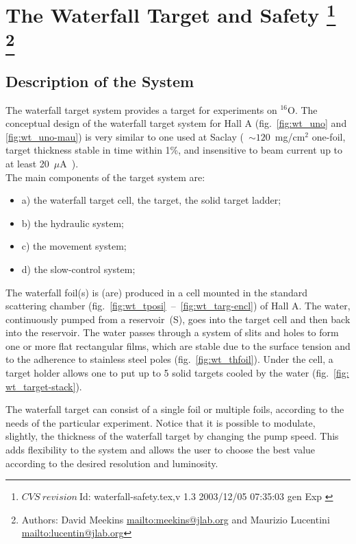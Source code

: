 \chapter[The Waterfall Target and Safety]{The Waterfall Target and Safety
\footnote{
  $CVS~revision~ $Id: waterfall-safety.tex,v 1.3 2003/12/05 07:35:03 gen Exp $ $
}
\footnote{Authors: David Meekins \url{mailto:meekins@jlab.org} and 
 Maurizio Lucentini \url{mailto:lucentin@jlab.org}}
}

\section{Description of the System}

The waterfall target system provides a target for experiments on $^{16}$O.
The conceptual design of the waterfall target system for Hall A (fig.~\ref{fig:wt_uno}
and \ref{fig:wt_uno-mau}) is very similar to one used at Saclay (~$\sim 120$~mg/cm$^{2}$
one-foil, target thickness stable in time within 1\%, and insensitive
to beam current up to at least 20~$\mu $A~\cite{Garibaldi:1992mb}).\\


The main components of the target system are: 

\begin{itemize}
\item a) the waterfall target cell, the target, the solid target ladder; 
\item b) the hydraulic system; 
\item c) the movement system; 
\item d) the slow-control system; 
\end{itemize}
The waterfall foil(s) is (are) produced in a cell mounted in the standard
scattering chamber (fig.~\ref{fig:wt_tposi}~--~\ref{fig:wt_targ-encl}) of Hall
A. The water, continuously pumped from a reservoir~(S), goes into
the target cell and then back into the reservoir. The water passes
through a system of slits and holes to form one or more flat rectangular
films, which are stable due to the surface tension and to the adherence
to stainless steel poles (fig.~\ref{fig:wt_thfoil}). Under the cell, a
target holder allows one to put up to 5 solid targets cooled by the
water (fig.~\ref{fig: wt_target-stack}).

The waterfall target can consist of a single foil or multiple foils,
according to the needs of the particular experiment. Notice that it
is possible to modulate, slightly, the thickness of the waterfall
target by changing the pump speed. This adds flexibility to the system
and allows the user to choose the best value according to the desired
resolution and luminosity.

